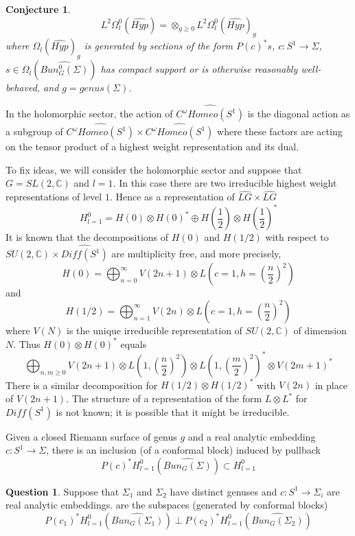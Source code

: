 \documentclass{amsart}
\theoremstyle{conjecture}
\newtheorem{conjecture}{Conjecture}
\theoremstyle{definition}
\theoremstyle{question}
\newtheorem{question}{Question}
\theoremstyle{questions}
\theoremstyle{remark}
\theoremstyle{remarks}
\theoremstyle{example}
\numberwithin{equation}{section}
\begin{document}
\begin{conjecture}\label{Virdecomposition2}
$$L^2\Omega_l^0(\widehat{Hyp})=\otimes_{g\ge 0}L^2\Omega_l^0(\widehat{Hyp})_g $$
where $\Omega_l(\widehat{Hyp})_g  $ is generated by sections of the form $P(c)^*s$, $c:S^1 \to\Sigma$, $s\in \Omega_l(\widehat{Bun_G^0(\Sigma)})$ has compact support or is otherwise reasonably well-behaved, and $g=genus(\Sigma)$.


\end{conjecture}



In the holomorphic
sector, the action of $\widehat{C^{\omega}Homeo(S^1)}$ is the diagonal action
as a subgroup of $\widehat{C^{\omega}Homeo(S^1)}\times\widehat{C^{\omega}Homeo(S^1)}$
where these factors are acting on the tensor product of a highest weight representation and its dual.

To fix ideas, we will consider the holomorphic sector and suppose that $G=SL(2,\mathbb C)$ and $l=1$.  In
this case there are two irreducible highest weight representations of level $1$.
Hence as a representation of $\widehat {LG}\times\widehat {LG}$
$$H^0_{l=1}=H(0)\otimes H(0)^{*}\oplus H(\frac 12)\otimes H(\frac
12)^{*}$$
It is known that the decompositions of $H(0)$ and $H(1/2)$ with respect to
$SU(2,\mathbb C)\times \widehat {Diff(S^1)}$ are multiplicity free, and more precisely,
$$H(0)=\bigoplus_{n=0}^{\infty}V(2n+1)\otimes L(c=1,h=(\frac n2)^
2)$$
and
$$H(1/2)=\bigoplus_{n=1}^{\infty}V(2n)\otimes L(c=1,h=(\frac n2)^
2)$$
where $V(N)$ is the unique irreducible representation of
$SU(2,\mathbb C)$ of dimension $N$.  Thus $H(0)\otimes H(0)^*$ equals
$$\bigoplus_{n, m\ge 0}V(2n+1)\otimes L(1,(\frac n
2)^2)\otimes L(1,(\frac m2)^2)^{*}\otimes V(2m+1)^{*}$$
There is a similar decomposition for $H(1/2)\otimes H(1/2)^*$ with $V(2n)$ in place of $V(2n+1)$.
The structure of a representation of the form $L\otimes L^{*}$ for
$Diff(S^1)$ is not known; it is possible that it might be
irreducible.

Given a closed Riemann surface of genus $g$ and a real analytic embedding $c:S^1 \to \Sigma$, there is an inclusion (of a conformal block)
induced by pullback
$$P(c)^*H^0_{l=1}\left(\widehat{ Bun_G(\Sigma)}\right) \subset H^0_{l=1}$$

\begin{question}Suppose that $\Sigma_1$ and $\Sigma_2$ have distinct genuses and $c:S^1 \to\Sigma_i$ are real analytic embeddings. are the subspaces (generated by conformal blocks)
$$P(c_1)^*H^0_{l=1}\left(\widehat{ Bun_G(\Sigma_1)}\right)\perp P(c_2)^*H^0_{l=1}\left(\widehat{ Bun_G(\Sigma_2)}\right)$$
\end{question}
\end{document}
